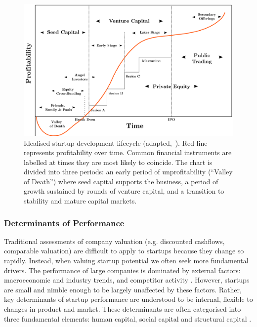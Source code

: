 \documentclass[../thesis/thesis.tex]{subfiles}
\begin{document}
\begin{refsection}
\begin{figure}[!htb]
    \centering
    \includegraphics[width=\textwidth]{../diagrams/figures/lifecycle.pdf}
    \caption{Idealised startup development lifecycle (adapted,~\cite{lifecycle2009}). Red line represents profitability over time. Common financial instruments are labelled at times they are most likely to coincide. The chart is divided into three periods: an early period of unprofitability (``Valley of Death'') where seed capital supports the business, a period of growth sustained by rounds of venture capital, and a transition to stability and mature capital markets.}
    \label{fig:litreview:theory:lifecycle}
\end{figure}

\subsubsection{Determinants of Performance}{}

Traditional assessments of company valuation (e.g. discounted cashflows, comparable valuation) are difficult to apply to startups because they change so rapidly. Instead, when valuing startup potential we often seek more fundamental drivers. The performance of large companies is dominated by external factors: macroeconomic and industry trends, and competitor activity \cite{hansen1989}. However, startups are small and nimble enough to be largely unaffected by these factors. Rather, key determinants of startup performance are understood to be internal, flexible to changes in product and market. These determinants are often categorised into three fundamental elements: human capital, social capital and structural capital \cite{baum2004, ahlers2015}.


\end{refsection}
\end{document}
